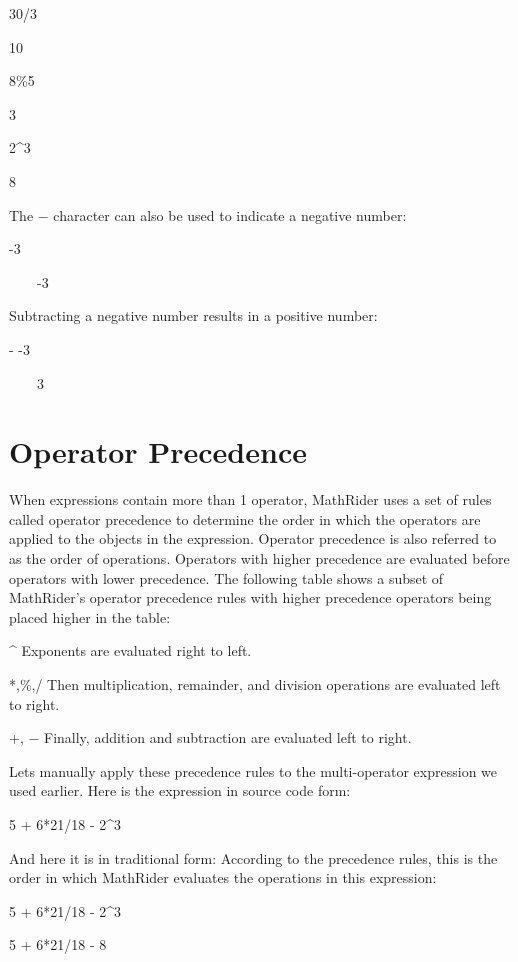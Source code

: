 \documentclass[12pt,oneside]{book}
\begin{document}
30/3

{\textbar}

10


8\%5

{\textbar}

3


2\^{}3

{\textbar}

8


The $-$ character can also be used to indicate a negative number:


{}-3

{\textbar}

\ \ \ \ {}-3


Subtracting a negative number results in a positive number:


{}- {}-3

{\textbar}

\ \ \ \ 3

\section[Operator Precedence]{Operator Precedence}

When expressions contain more than 1 operator, MathRider uses a set of rules called operator precedence to determine the order in which the operators are applied to the objects in the expression. Operator precedence is also referred to as the order of operations. Operators with higher precedence are evaluated before operators with lower precedence. The following table shows a subset of MathRider's operator precedence rules with higher precedence operators being placed higher in the table: 

\^{} Exponents are evaluated right to left.


*,\%,/ Then multiplication, remainder, and division operations are evaluated left to right. 

+, $-$ Finally, addition and subtraction are evaluated left to right.


Lets manually apply these precedence rules to the multi{}-operator expression we used earlier. Here is the expression in source code form: 

5 + 6*21/18 {}- 2\^{}3


And here it is in traditional form:
According to the precedence rules, this is the order in which MathRider evaluates the operations in this expression: 

5 + 6*21/18 {}- 2\^{}3

5 + 6*21/18 {}- 8
\end{document}

